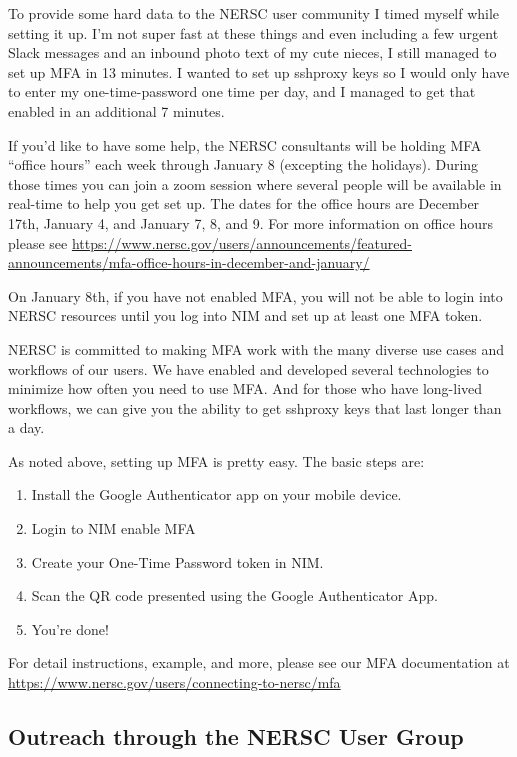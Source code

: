 \documentclass[sigconf,review]{acmart}
\begin{document}
To provide some hard data to the NERSC user community I timed myself while setting it up.  I’m not super fast at these things and even including a few urgent Slack messages and an inbound photo text of my cute nieces, I still managed to set up MFA in 13 minutes.  I wanted to set up sshproxy keys so I would only have to enter my one-time-password one time per day, and I managed to get that enabled in an additional 7 minutes.  

If you'd like to have some help, the NERSC consultants will be holding MFA ``office hours'' each week through January 8 (excepting the holidays).  During those times you can join a zoom session where several people will be available in real-time to help you get set up. The dates for the office hours are December 17th, January 4, and January 7, 8, and 9. For more information on office hours please see \url{https://www.nersc.gov/users/announcements/featured-announcements/mfa-office-hours-in-december-and-january/}

On January 8th, if you have not enabled MFA, you will not be able to login into NERSC resources until you log into NIM and set up at least one MFA token.  

NERSC is committed to making MFA work with the many diverse use cases and workflows of our users.  We have enabled and developed several technologies to minimize how often you need to use MFA.  And for those who have long-lived workflows, we can give you the ability to get sshproxy keys that last longer than a day.

As noted above, setting up MFA is pretty easy.  The basic steps are:

\begin{enumerate}
\item Install the Google Authenticator app on your mobile device.
\item Login to NIM enable MFA
\item Create your One-Time Password token in NIM.
\item Scan the QR code presented using the Google Authenticator App.
\item You're done!
\end{enumerate}

For detail instructions, example, and more, please see our MFA documentation at
\url{https://www.nersc.gov/users/connecting-to-nersc/mfa}

\subsection{Outreach through the NERSC User Group}
\label{nug}
\end{document}
